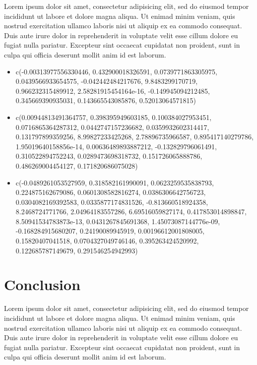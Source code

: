 \documentclass[
  10pt,
]{article}
\providecommand{\tightlist}{%
  \setlength{\itemsep}{0pt}\setlength{\parskip}{0pt}}
\begin{document}
Lorem ipsum dolor sit amet, consectetur adipisicing elit, sed do eiusmod
tempor incididunt ut labore et dolore magna aliqua. Ut enimad minim
veniam, quis nostrud exercitation ullamco laboris nisi ut aliquip ex ea
commodo consequat. Duis aute irure dolor in reprehenderit in voluptate
velit esse cillum dolore eu fugiat nulla pariatur. Excepteur sint
occaecat cupidatat non proident, sunt in culpa qui officia deserunt
mollit anim id est laborum.

\begin{itemize}
\tightlist
\item
  c(-0.00313977556330446, 0.432900018326591, 0.0739771863305975,
  0.0439566933654575, -0.042442484217676, 9.8483299170719,
  0.966232315489912, 2.58281915454164e-16, -0.149945094212485,
  0.345669390935031, 0.143665543085876, 0.52013064571815)
\item
  c(0.00944813491364757, 0.398395949603185, 0.100384027953451,
  0.0716865364287312, 0.0442747157236682, 0.0359932602314417,
  0.131797899359256, 8.99827233425268, 2.78896735966587,
  0.895417140279786, 1.95019640158856e-14, 0.00636489893887212,
  -0.132829796061491, 0.310522894752243, 0.0289473698318732,
  0.151726065888786, 0.486269004454127, 0.171820686075028)
\item
  c(-0.0489261053527959, 0.318582161990091, 0.0623259535838793,
  0.224875162679086, 0.0601308582816274, 0.0386306642756723,
  0.0304082169392583, 0.0335877174831526, -0.813660518924358,
  8.2468724771766, 2.04964183557286, 6.69516059827174,
  0.417853014898847, 8.50941534783873e-13, 0.0431267845691368,
  1.45073087144776e-09, -0.168284915680207, 0.24190089945919,
  0.00196612001808005, 0.15820407041518, 0.0704327049746146,
  0.395263424520992, 0.122685787149679, 0.291546254942993)
\end{itemize}

\hypertarget{conclusion-1}{%
\section{Conclusion}\label{conclusion-1}}

Lorem ipsum dolor sit amet, consectetur adipisicing elit, sed do eiusmod
tempor incididunt ut labore et dolore magna aliqua. Ut enimad minim
veniam, quis nostrud exercitation ullamco laboris nisi ut aliquip ex ea
commodo consequat. Duis aute irure dolor in reprehenderit in voluptate
velit esse cillum dolore eu fugiat nulla pariatur. Excepteur sint
occaecat cupidatat non proident, sunt in culpa qui officia deserunt
mollit anim id est laborum.
\end{document}
